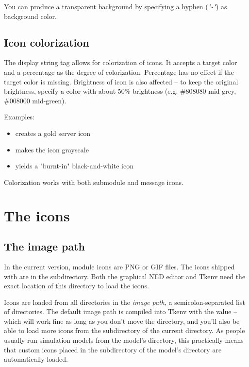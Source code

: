 You can produce a transparent background by specifying a hyphen (\textit{"-"})
as background color.


\subsection{Icon colorization}

The  display string tag allows for colorization of icons.
It accepts a target color and a percentage as the degree of colorization.
Percentage has no effect if the target color is missing.
Brightness of icon is also affected -- to keep the original brightness,
specify a color with about 50\% brightness (e.g. \#808080 mid-grey,
\#008000 mid-green).

Examples:

\begin{itemize}
  \item {} creates a gold server icon
  \item {} makes the icon grayscale
  \item {} yields a "burnt-in" black-and-white icon
\end{itemize}

Colorization works with both submodule and message icons.


\section{The icons}
\label{sec:ch-graphics:icon-library}

\subsection{The image path}

In the current {\opp} version, module icons are PNG or GIF files. The icons shipped
with {\opp} are in the  subdirectory. Both the graphical NED editor
and Tkenv need the exact location of this directory to load the icons.

Icons are loaded from all directories in the \textit{image path},
a semicolon-separated list of directories.
The default image path is compiled into Tkenv with the value
 -- which will work fine
as long as you don't move the directory, and you'll also be able to
load more icons from the  subdirectory of the current
directory. As people usually run simulation models from the model's
directory, this practically means that custom icons placed in the
 subdirectory of the model's directory are automatically
loaded.

